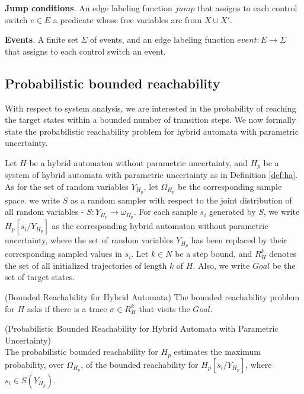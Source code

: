 {\begin{definition}
{\bf Jump conditions}. An edge labeling function $jump$ that assigns to each control switch $e \in E$ a predicate whose free variables are from $X \cup X'$.

{\bf Events}. A finite set $\Sigma$ of events, and an edge labeling function $event: E \to \Sigma$ that assigns to each control switch an event. 
 
\end{definition}

\subsection{Probabilistic bounded reachability}
With respect to system analysis, we are interested in the probability of reaching the target states within a bounded number of transition steps. We now formally state the probabilistic reachability problem for hybrid automata with parametric uncertainty. 

Let $H$ be a hybrid automaton without parametric uncertainty, and $H_p$ be a system of hybrid automata with parametric uncertainty as in Definition \ref{def:ha}. As for the set of random variables $Y_{H_p}$, let $\Omega_{H_p}$ be the corresponding sample space. we write $S$ as a random sampler with respect to the joint distribution of all random variables - $S: Y_{H_p} \to \omega_{H_p}$. For each sample $s_i$ generated by $S$, we write $H_{p}[s_i/Y_{H_p}]$ as the corresponding hybrid automaton without parametric uncertainty, where the set of random variables $Y_{H_p}$ has been replaced by their corresponding sampled values in $s_i$. Let $k \in N$ be a step bound, and $R_{H}^k$ denotes the set of all initialized trajectories of length $k$ of $H$. Also, we write $Goal$ be the set of target states.
\begin{remark}
\label{def:br}
{\rm (Bounded Reachability for Hybrid Automata)}
The bounded reachability problem for $H$ asks if there is a trace $\sigma \in R_{H}^k$ that visits the $Goal$.
\end{remark}
\begin{definition}
\label{def:pbr}
{\rm (Probabilistic Bounded Reachability for Hybrid Automata with Parametric Uncertainty)}\\
The probabilistic bounded reachability for $H_p$ estimates the maximum probability, over $\Omega_{H_p}$, of the bounded reachability for $H_{p}[s_i/Y_{H_p}]$, where $s_i \in S(Y_{H_p})$.
\end{definition}
}

